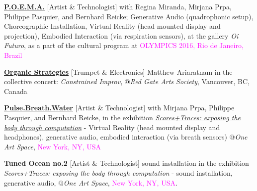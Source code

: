 \documentclass[10pt,letterpaper]{moderncv} %
\begin{document}
 {\textbf{\href{https://kivanctatar.com/POEMA}{P.O.E.M.A.}} [Artist \& Technologist] with Regina Miranda, Mirjana Prpa, Philippe Pasquier, and Bernhard Reicke; Generative Audio (quadrophonic setup), Choreographic Installation, Virtual Reality (head mounted display and projection), Embodied Interaction (via respiration sensors), at the gallery \textit{Oi Futuro}, as a part of the cultural program at \textcolor{magenta}{OLYMPICS 2016, Rio de Janeiro, Brazil}}


 {\href{https://kivanctatar.com/Organic-Strategies}{\textbf{Organic Strategies}} [Trumpet \& Electronics] Matthew Ariaratnam in the collective concert: \textit{Constrained Improv}, @\textit{Red Gate Arts Society}, Vancouver, BC, Canada}

 {\href{https://kivanctatar.com/Pulse-Breath-Water}{\textbf{Pulse.Breath.Water}} [Artist \& Technologist] with Mirjana Prpa, Philippe Pasquier, and Bernhard Reicke, in the exhibition \href{http://oneartspace.com/2016/03/10/scorestraces-exposing-the-body-through-computation/}{\textit{Scores+Traces: exposing the body through computation}} - Virtual Reality (head mounted display and headphones), generative audio, embodied interaction (via breath sensors) @\textit{One Art Space}, \textcolor{magenta}{New York, NY, USA}}

 {\textbf{Tuned Ocean no.2} [Artist \& Technologist] sound installation in the exhibition \textit{Scores+Traces: exposing the body through computation}  - sound installation, generative audio, @\textit{One Art Space}, \textcolor{magenta}{New York, NY, USA}.}


\end{document}
